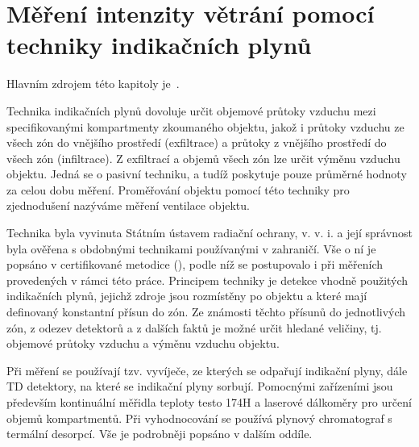 \chapter{Měření intenzity větrání pomocí techniky indikačních plynů}\label{navesti:prutoky}
Hlavním zdrojem této kapitoly je~\cite{metodika}.

Technika indikačních plynů dovoluje určit objemové průtoky vzduchu mezi specifikovanými kompartmenty zkoumaného objektu, jakož i průtoky vzduchu ze všech zón do vnějšího prostředí (exfiltrace) a průtoky z vnějšího prostředí do všech zón (infiltrace). Z exfiltrací a objemů všech zón lze určit výměnu vzduchu objektu. Jedná se o pasivní techniku, a tudíž poskytuje pouze průměrné hodnoty za celou dobu měření. Proměřování objektu pomocí této techniky pro zjednodušení nazýváme měření ventilace objektu.

Technika byla vyvinuta Státním ústavem radiační ochrany, v. v. i. a její správnost byla ověřena s obdobnými technikami používanými v zahraničí. Vše o ní je popsáno v certifikované metodice (\cite{metodika}), podle níž se postupovalo i při měřeních provedených v rámci této práce. Principem techniky je detekce vhodně použitých indikačních plynů, jejichž zdroje jsou rozmístěny po objektu a které mají definovaný konstantní přísun do zón. Ze známosti těchto přísunů do jednotlivých zón, z odezev detektorů a z dalších faktů je možné určit hledané veličiny, tj. objemové průtoky vzduchu a výměnu vzduchu objektu.

Při měření se používají tzv. vyvíječe, ze kterých se odpařují indikační plyny, dále TD detektory, na které se indikační plyny sorbují. Pomocnými zařízeními jsou především kontinuální měřidla teploty testo 174H a laserové dálkoměry pro určení objemů kompartmentů. Při vyhodnocování se používá plynový chromatograf s termální desorpcí. Vše je podrobněji popsáno v dalším oddíle.

